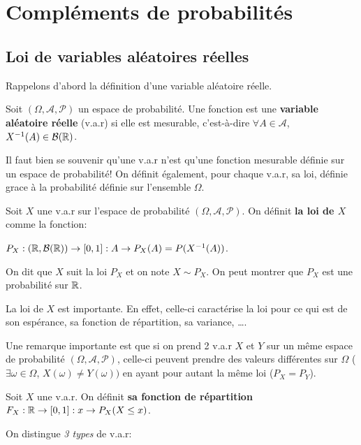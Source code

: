 \chapter{Compléments de probabilités}

\section{Loi de variables aléatoires réelles}

Rappelons d'abord la définition d'une variable aléatoire réelle.

\begin{definition}
	Soit $(\Omega, \mathcal{A}, \mathcal{P})$ un espace de probabilité.
	Une fonction  est une \textbf{variable
	aléatoire réelle} (v.a.r) si elle est mesurable, c'est-à-dire $\forall A \in
	\mathcal{A}$, $X^{-1}(A) \in \mathcal{B}(\mathbb{R})$.
\end{definition}

Il faut bien se souvenir qu'une v.a.r n'est qu'une fonction mesurable définie
sur un espace de probabilité!
On définit également, pour chaque v.a.r, sa loi, définie grace à la probabilité
définie sur l'ensemble $\Omega$.

\begin{definition}
	Soit $X$ une v.a.r sur l'espace de probabilité $(\Omega, \mathcal{A},
	\mathcal{P})$. On définit \textbf{la loi de $X$} comme la fonction:

	$P_{X} : (\mathbb{R}, \mathcal{B}(\mathbb{R})) \rightarrow [0, 1] : A
	\rightarrow P_{X}(A) = P(X^{-1}(A))$.

	On dit que $X$ suit la loi $P_{X}$ et on note $X \sim P_{X}$.
	On peut montrer que $P_{X}$ est une probabilité sur $\mathbb{R}$.
\end{definition}

La loi de $X$ est importante. En effet, celle-ci caractérise la loi pour ce qui
est de son espérance, sa fonction de répartition, sa variance, \ldots.

Une remarque importante est que si on prend 2 v.a.r $X$ et $Y$ sur un même
espace de probabilité $(\Omega, \mathcal{A}, \mathcal{P})$, celle-ci peuvent
prendre des valeurs différentes sur $\Omega$ ($\exists \omega \in \Omega$,
$X(\omega) \neq Y(\omega))$ en ayant pour autant la même loi ($P_{X} = P_{Y}$).

\begin{definition}
	Soit $X$ une v.a.r. On définit \textbf{sa fonction de répartition} $F_{X} :
	\mathbb{R} \rightarrow [0, 1] : x \rightarrow P_{X}(X \leq x)$.
\end{definition}
On distingue \textit{3 types} de v.a.r:

